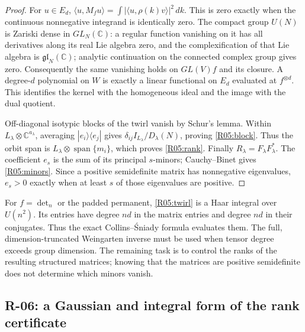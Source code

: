 \begin{proof}
For $u\in E_d$,
$\langle u,M_fu\rangle=\int|\langle u,\rho(k)v\rangle|^2\,dk$.
This is zero exactly when the continuous nonnegative integrand is
identically zero. The compact group $U(N)$ is Zariski dense in
$GL_N(\mathbb C)$: a regular function vanishing on it has all derivatives
along its real Lie algebra zero, and the complexification of that Lie
algebra is $\mathfrak{gl}_N(\mathbb C)$; analytic continuation on the
connected complex group gives zero. Consequently the same vanishing
holds on $GL(V)f$ and its closure. A degree-$d$ polynomial on $W$ is
exactly a linear functional on $E_d$ evaluated at $f^{\otimes d}$.
This identifies the kernel with the homogeneous ideal and the image
with the dual quotient.

Off-diagonal isotypic blocks of the twirl vanish by Schur's lemma.
Within $L_\lambda\otimes\mathbb C^{a_\lambda}$, averaging
$|e_i\rangle\langle e_j|$ gives
$\delta_{ij}I_{L_\lambda}/D_\lambda(N)$, proving
\eqref{R05:block}. Thus the orbit span is
$L_\lambda\otimes\operatorname{span}\{m_i\}$, which proves
\eqref{R05:rank}. Finally $R_\lambda=F_\lambda F_\lambda^*$.
The coefficient $e_s$ is the sum of its principal $s$-minors;
Cauchy--Binet gives \eqref{R05:minors}. Since a positive semidefinite
matrix has nonnegative eigenvalues, $e_s>0$ exactly when at least $s$
of those eigenvalues are positive.
\end{proof}

For $f=\det_n$ or the padded permanent, \eqref{R05:twirl} is a Haar
integral over $U(n^2)$. Its entries have degree $nd$ in the matrix
entries and degree $nd$ in their conjugates. Thus the exact
Collins--\'Sniady formula evaluates them. The full, dimension-truncated
Weingarten inverse must be used when tensor degree exceeds group
dimension. The remaining task is to control the ranks of the resulting
structured matrices; knowing that the matrices are positive
semidefinite does not determine which minors vanish.

\subsection{R-06: a Gaussian and integral form of the rank certificate}

